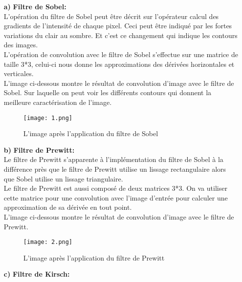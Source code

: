 \documentclass[a4paper,11pt]{report}
\theoremstyle{definition}
\begin{document}
\begin{itemize}
    \item [\textbf{a)}] \textbf{Filtre de Sobel:} \\
    
    L’opération du filtre de Sobel peut être décrit sur l’opérateur calcul des gradients de l’intensité  de chaque pixel. Ceci peut être indiqué par les fortes variations du clair au sombre. Et c'est ce changement qui indique les contours des images. \\
	L’opération de convolution avec le filtre de Sobel s’effectue sur une matrice de taille 3*3, celui-ci nous donne les approximations des dérivées horizontales et verticales. \\
 
	L’image ci-dessous montre le résultat de convolution d’image avec le filtre de Sobel. Sur laquelle on peut voir les différents contours qui donnent la meilleure caractérisation de l’image.  
   \begin{figure}[!htbp]
   \begin{center}
   \texttt{[image: 1.png]}
   \caption{L'image après l'application du filtre de Sobel \cite{ref11} }
   \end{center}
   \end{figure}

	  \item [\textbf{b)}] \textbf{Filtre de Prewitt:}\\
	  
	  Le filtre de Prewitt s’apparente à l’implémentation du filtre de Sobel à la différence près que le filtre de Prewitt utilise un lissage rectangulaire alors que Sobel utilise un lissage triangulaire. \\
	Le filtre de Prewitt est aussi composé de deux matrices 3*3. On va utiliser cette matrice pour  une convolution avec l’image d’entrée pour calculer une approximation de sa dérivée en tout point. \\
	
    L’image ci-dessous montre le résultat de convolution d’image avec le filtre de Prewitt.  
    \begin{figure}[!htbp]
   \begin{center}
   \texttt{[image: 2.png]}
   \caption{L'image après l'application du filtre de Prewitt \cite{ref11} }
   \end{center}
   \end{figure}
	  
	    \item [\textbf{c)}] \textbf{Filtre de Kirsch:} \\
	    

\end{itemize}
\end{document}
